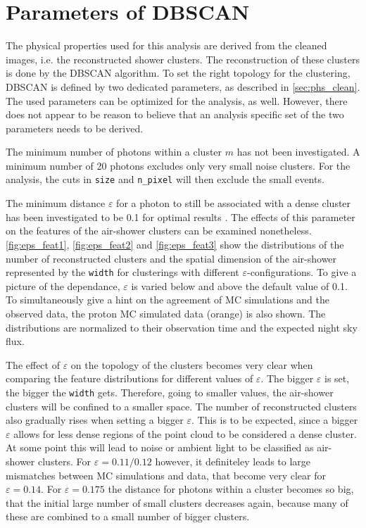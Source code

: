 \section{Parameters of DBSCAN}
%
The physical properties used for this analysis are derived from the cleaned
images, i.e. the reconstructed shower clusters. The reconstruction of these
clusters is done by the DBSCAN algorithm. To set the right topology for the
clustering, DBSCAN is defined by two dedicated parameters, as described in
\autoref{sec:phs_clean}. The used parameters can be optimized for the analysis,
as well. However, there does not appear to be reason to believe that an
analysis specific set of the two parameters needs to be derived.

The minimum number of photons within a cluster $m$ has not been investigated. A
minimum number of \num{20} photons excludes only very small noise clusters. For
the analysis, the cuts in \texttt{size} and \texttt{n\_pixel} will then
exclude the small events.

The minimum distance $\varepsilon$ for a photon to still be associated with a
dense cluster has been investigated to be \num{0.1} for optimal results \cite{sebastian}. The
effects of this parameter on the features of the air-shower clusters can be
examined nonetheless. \autoref{fig:eps_feat1}, \ref{fig:eps_feat2} and
\ref{fig:eps_feat3} show the distributions of the number of reconstructed
clusters and the spatial dimension of the air-shower represented by the
\texttt{width} for clusterings with different $\varepsilon$-configurations. To
give a picture of the dependance, $\varepsilon$ is varied below and above the
default value of \num{0.1}. To simultaneously give a hint on the agreement of
MC simulations and the observed data, the proton MC simulated data (orange) is
also shown. The distributions are normalized to their observation time and the
expected night sky flux.

The effect of $\varepsilon$ on the topology of the clusters becomes very clear
when comparing the feature distributions for different values of $\varepsilon$.
The bigger $\varepsilon$ is set, the bigger the \texttt{width} gets. Therefore,
going to smaller values, the air-shower clusters will be confined to a smaller
space. The number of reconstructed clusters also gradually rises when setting
a bigger $\varepsilon$. This is to be expected, since a bigger $\varepsilon$
allows for less dense regions of the point cloud to be considered a dense
cluster. At some point this will lead to noise or ambient light to be
classified as air-shower clusters. For $\varepsilon = 0.11 / 0.12$ however, it
definiteley leads to large mismatches between MC simulations and data, that
become very clear for $\varepsilon = 0.14$. For $\varepsilon = 0.175$ the
distance for photons within a cluster becomes so big, that the initial large
number of small clusters decreases again, because many of these are combined to
a small number of bigger clusters.

